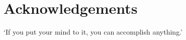\chapter{Acknowledgements}
\begin{semiLarge}
\begin{center}
\enquote*{If you put your mind to it, you can accomplish anything.}
\end{center}
\end{semiLarge}
